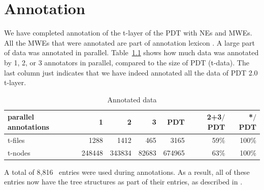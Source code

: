 
\chapter{Annotation}
\label{sec:annot}

%
We have completed annotation of the t-layer of the PDT with NEs and MWEs. All the MWEs that were annotated are part of annotation lexicon \semlex. A large part of data was annotated in parallel. Table~\ref{tab:parallel-anot} shows how much data was annotated by 1, 2, or 3 annotators in parallel, compared to the size of PDT (t-data). The last column just indicates that we have indeed annotated all the data of PDT 2.0 t-layer.
\label{tab:parallel-anot}

\begin{table}[htdp]
\begin{tabular}{l|r|r|r|r|r|r}
 parallel annotations  & 1    & 2    & 3   & PDT    & 2+3$/$PDT & *$/$PDT \\
 \hline
 t-files & 1288   & 1412   & 465   & 3165   & 59\%        & 100\% \\
 t-nodes & 248448 & 343834 & 82683 & 674965 & 63\%        & 100\% \\
\end{tabular}
\caption{Annotated data}
\label{tab:parallel-anot}
\end{table}%

A total of 8,816 \semlex\ entries were used during annotations. As a result, all of these entries now have the tree structures as part of their entries, as described in .

